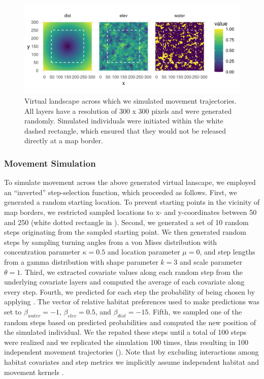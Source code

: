 \documentclass[abstract=on,10pt,a4paper,bibliography=totocnumbered]{article}
\begin{document}
\begin{figure}
  \begin{center}
  \includegraphics[width = \textwidth]{99_Covariates.png}
  \caption{Virtual landscape across which we simulated movement trajectories.
  All layers have a resolution of 300 x 300 pixels and were generated randomly.
  Simulated individuals were initiated within the white dashed rectangle, which
  ensured that they would not be released directly at a map border.}
  \label{Covariates}
  \end{center}
\end{figure}

\subsubsection{Movement Simulation}
To simulate movement across the above generated virtual lanscape, we employed an
``inverted'' step-selection function, which proceeded as follows. First, we
generated a random starting location. To prevent starting points in the vicinity
of map borders, we restricted sampled locations to x- and y-coordinates between
50 and 250 (white dotted rectangle in ). Second, we generated a
set of 10 random steps originating from the sampled starting point. We then
generated random steps by sampling turning angles from a von Mises distribution
with concentration parameter \(\kappa = 0.5\) and location parameter \( \mu = 0
\), and step lengths from a gamma distribution with shape parameter \(k = 3 \)
and scale parameter \(\theta = 1\). Third, we extracted covariate values along
each random step from the underlying covariate layers and computed the average
of each covariate along every step. Fourth, we predicted for each step the
probability of being chosen by applying . The vector of relative
habitat preferences used to make predictions was set to \(\beta_{water} = -1\),
\(\beta_{elev} = 0.5\), and \(\beta_{dist} = -15\). Fifth, we sampled one of the
random steps based on predicted probabilities and computed the new position of
the simulated individual. We the repated these steps until a total of 100 steps
were realized and we replicated the simulation 100 times, thus resulting in 100
independent movement trajectories (). Note that by excluding
interactions among habitat covariates and step metrics we implicitly assume
independent habitat and movement kernels \citep{Avgar.2016}.
\end{document}
